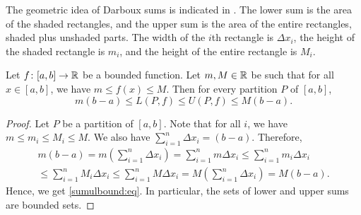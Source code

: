 The geometric idea of Darboux sums is indicated in
.  The lower sum is the area of the shaded
rectangles, and the upper sum is the area of the entire
rectangles, shaded plus unshaded parts.  The width of the $i$th rectangle is $\Delta x_i$,
the height of the shaded rectangle is $m_i$, and the height
of the entire rectangle is $M_i$.

\begin{myfigureht}
\caption{Sample Darboux sums.\label{darbouxfig}}
\end{myfigureht}

\begin{prop} \label{sumulbound:prop}
Let $f \colon [a,b] \to {\mathbb{R}}$ be a bounded function.  Let $m, M \in {\mathbb{R}}$ be 
such that for all $x \in [a,b]$, we have $m \leq f(x) \leq M$.  Then for every partition $P$
of $[a,b]$,
\begin{equation}
\label{sumulbound:eq}
m(b-a) \leq
L(P,f) \leq U(P,f)
\leq M(b-a) .
\end{equation}
\end{prop}

\begin{proof}
Let $P$ be a partition of $[a,b]$.  Note that for all $i$, we
have $m \leq m_i \leq M_i \leq M$.  We also have
$\sum_{i=1}^n \Delta x_i = (b-a)$.  Therefore,
\begin{multline*}
m(b-a) =
m \left( \sum_{i=1}^n \Delta x_i \right)
=
\sum_{i=1}^n m \Delta x_i
\leq
\sum_{i=1}^n m_i \Delta x_i 
\\
\leq
\sum_{i=1}^n M_i \Delta x_i
\leq
\sum_{i=1}^n M \Delta x_i 
=
M \left( \sum_{i=1}^n \Delta x_i \right)
=
M(b-a) .
\end{multline*}
Hence, we get \eqref{sumulbound:eq}.  In particular, the sets of lower and
upper sums are bounded sets.
\end{proof}

